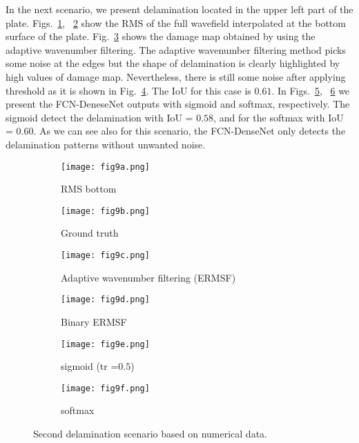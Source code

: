In the next scenario, we present delamination located in the upper left part of the plate.
Figs.~\ref{fig:dispersion30deg_direct}, ~\ref{fig:m1_rand_single_delam_454} show the RMS of the full wavefield interpolated at the bottom surface of the plate.
Fig.~\ref{fig:ERMSF_flat_shell_Vz_454} shows the damage map obtained by using the adaptive wavenumber filtering.
The adaptive wavenumber filtering method picks some noise at the edges but the shape of delamination is clearly highlighted by high values of damage map.
Nevertheless, there is still some noise after applying threshold as it is shown in Fig.~\ref{fig:Binary_ERMSF}.
The IoU for this case is \(0.61\).
In Figs.~\ref{fig:predict_454_sigmoid_tr_0.5}, ~\ref{fig:predict_454_softmax} we present the FCN-DeneseNet outputs with sigmoid and softmax, respectively.
The sigmoid detect the delamination with IoU = \(0.58\), and for the softmax with IoU = \(0.60\).
As we can see also for this scenario, the FCN-DenseNet only detects the delamination patterns without unwanted noise.
	\begin{figure} [!h]
		\centering
		\begin{subfigure}[b]{0.47\textwidth}
			\centering
			\texttt{[image: fig9a.png]}
			\caption{RMS bottom}
			\label{fig:dispersion30deg_direct}
		\end{subfigure}
		\hfill
		\begin{subfigure}[b]{0.47\textwidth}
			\centering
			\texttt{[image: fig9b.png]}
			\caption{Ground truth}
			\label{fig:m1_rand_single_delam_454}
		\end{subfigure}
		\hfill
		\begin{subfigure}[b]{0.47\textwidth}
			\centering
			\texttt{[image: fig9c.png]}
			\caption{Adaptive wavenumber filtering (ERMSF)}
			\label{fig:ERMSF_flat_shell_Vz_454}
		\end{subfigure}
		\hfill
		\begin{subfigure}[b]{0.47\textwidth}
			\centering
			\texttt{[image: fig9d.png]}
			\caption{Binary ERMSF}
			\label{fig:Binary_ERMSF}
		\end{subfigure}
		\hfill
		\begin{subfigure}[b]{0.47\textwidth}
			\centering
			\texttt{[image: fig9e.png]}
			\caption{sigmoid (tr =\(0.5\))}
			\label{fig:predict_454_sigmoid_tr_0.5}
		\end{subfigure}
		\hfill	
		\begin{subfigure}[b]{0.47\textwidth}
			\centering
			\texttt{[image: fig9f.png]}
			\caption{softmax}
			\label{fig:predict_454_softmax}
		\end{subfigure}
		\caption{Second delamination scenario based on numerical data.}
		\label{fig:RMS454}
	\end{figure} 

